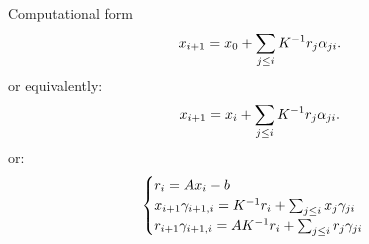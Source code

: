 
\begin{comment}
  \frame{\frametitle{Juggling polynomials}

    For $i=1$:
    \[
    r_1 = (\alpha_1AK\inv+\alpha_2I)r_0 \Rightarrow 
    AK\inv r_0 = \beta_1r_1+\beta_0r_0
    \]
    for some values $\alpha_i,\beta_i$. 

    For $i=2$
    \[ r_2 = (\alpha_2(AK\inv )^2+\alpha_1AK\inv +\alpha_0)r_0 \]
    for different values~$\alpha_i$. 

    Together:
    \[ (AK\inv)^2r_0\in \setspan{r_2,r_1,r_0}, \]
    and inductively
    \begin{equation}
      (AK\inv)^ir_0\in\setspan{r_i,\ldots,r_0}.
    \end{equation}
  }
\end{comment}

\begin{simplified}
  \begin{frame}{Computational form}
    \[
    x_{i+1} = x_0 +\sum_{j\leq i} K^{-1} r_j\alpha_{ji}.
    \]
    or equivalently:
    \[
    x_{i+1} = x_i +\sum_{j\leq i} K^{-1} r_j\alpha_{ji}.
    \]
    or:    
    \[
    \begin{cases}
      r_i = Ax_i-b\\
      x_{i+1}\gamma_{i+1,i}=K^{-1} r_i+\sum_{j\leq i} x_j\gamma_{ji}\\
      r_{i+1}\gamma_{i+1,i}=AK^{-1} r_i+\sum_{j\leq i} r_j\gamma_{ji}
    \end{cases}
    \]
  \end{frame}
\end{simplified}

